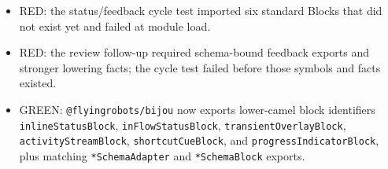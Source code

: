 \begin{itemize}
\tightlist
\item
  RED: the status/feedback cycle test imported six standard Blocks that did not exist yet and failed at module load.
\item
  RED: the review follow-up required schema-bound feedback exports and stronger lowering facts; the cycle test failed before those symbols and facts existed.
\item
  GREEN: \texttt{@\allowbreak{}f\allowbreak{}l\allowbreak{}y\allowbreak{}i\allowbreak{}n\allowbreak{}g\allowbreak{}r\allowbreak{}o\allowbreak{}b\allowbreak{}o\allowbreak{}t\allowbreak{}s\allowbreak{}/\allowbreak{}b\allowbreak{}i\allowbreak{}j\allowbreak{}o\allowbreak{}u} now exports lower-camel block identifiers \texttt{i\allowbreak{}n\allowbreak{}l\allowbreak{}i\allowbreak{}n\allowbreak{}e\allowbreak{}S\allowbreak{}t\allowbreak{}a\allowbreak{}t\allowbreak{}u\allowbreak{}s\allowbreak{}B\allowbreak{}l\allowbreak{}o\allowbreak{}c\allowbreak{}k}, \texttt{i\allowbreak{}n\allowbreak{}F\allowbreak{}l\allowbreak{}o\allowbreak{}w\allowbreak{}S\allowbreak{}t\allowbreak{}a\allowbreak{}t\allowbreak{}u\allowbreak{}s\allowbreak{}B\allowbreak{}l\allowbreak{}o\allowbreak{}c\allowbreak{}k}, \texttt{t\allowbreak{}r\allowbreak{}a\allowbreak{}n\allowbreak{}s\allowbreak{}i\allowbreak{}e\allowbreak{}n\allowbreak{}t\allowbreak{}O\allowbreak{}v\allowbreak{}e\allowbreak{}r\allowbreak{}l\allowbreak{}a\allowbreak{}y\allowbreak{}B\allowbreak{}l\allowbreak{}o\allowbreak{}c\allowbreak{}k}, \texttt{a\allowbreak{}c\allowbreak{}t\allowbreak{}i\allowbreak{}v\allowbreak{}i\allowbreak{}t\allowbreak{}y\allowbreak{}S\allowbreak{}t\allowbreak{}r\allowbreak{}e\allowbreak{}a\allowbreak{}m\allowbreak{}B\allowbreak{}l\allowbreak{}o\allowbreak{}c\allowbreak{}k}, \texttt{s\allowbreak{}h\allowbreak{}o\allowbreak{}r\allowbreak{}t\allowbreak{}c\allowbreak{}u\allowbreak{}t\allowbreak{}C\allowbreak{}u\allowbreak{}e\allowbreak{}B\allowbreak{}l\allowbreak{}o\allowbreak{}c\allowbreak{}k}, and \texttt{p\allowbreak{}r\allowbreak{}o\allowbreak{}g\allowbreak{}r\allowbreak{}e\allowbreak{}s\allowbreak{}s\allowbreak{}I\allowbreak{}n\allowbreak{}d\allowbreak{}i\allowbreak{}c\allowbreak{}a\allowbreak{}t\allowbreak{}o\allowbreak{}r\allowbreak{}B\allowbreak{}l\allowbreak{}o\allowbreak{}c\allowbreak{}k}, plus matching \texttt{*\allowbreak{}S\allowbreak{}c\allowbreak{}h\allowbreak{}e\allowbreak{}m\allowbreak{}a\allowbreak{}A\allowbreak{}d\allowbreak{}a\allowbreak{}p\allowbreak{}t\allowbreak{}e\allowbreak{}r} and \texttt{*\allowbreak{}S\allowbreak{}c\allowbreak{}h\allowbreak{}e\allowbreak{}m\allowbreak{}a\allowbreak{}B\allowbreak{}l\allowbreak{}o\allowbreak{}c\allowbreak{}k} exports.

\end{itemize}
